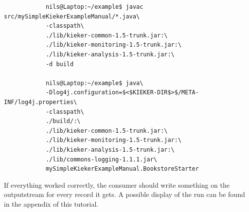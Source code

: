		\setBashListing 		
		\begin{lstlisting} 			
			nils@Laptop:~/example$ javac src/mySimpleKiekerExampleManual/*.java\
			-classpath\ 		
			./lib/kieker-common-1.5-trunk.jar:\
			./lib/kieker-monitoring-1.5-trunk.jar:\
			./lib/kieker-analysis-1.5-trunk.jar:\
			-d build

			nils@Laptop:~/example$ java\
			-Dlog4j.configuration=$<$KIEKER-DIR$>$/META-INF/log4j.properties\
			-classpath\ 	
			./build/:\
			./lib/kieker-common-1.5-trunk.jar:\
			./lib/kieker-monitoring-1.5-trunk.jar:\
			./lib/kieker-analysis-1.5-trunk.jar:\
			./lib/commons-logging-1.1.1.jar\
			mySimpleKiekerExampleManual.BookstoreStarter 
		\end{lstlisting}			

		If everything worked correctly, the consumer should write something on the outputstream for every record it gets. A possible display of the run can be found in the appendix of this tutorial. 